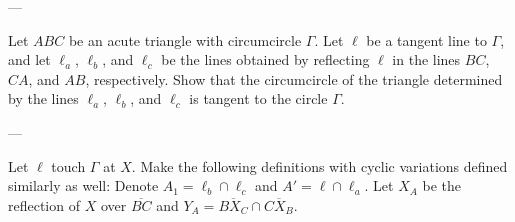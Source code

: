 
---

Let $ABC$ be an acute triangle with circumcircle $\Gamma$. Let $\ell$ be a tangent line to $\Gamma$, and let $\ell_a$, $\ell_b$, and $\ell_c$ be the lines obtained by reflecting $\ell$ in the lines $BC$, $CA$, and $AB$, respectively. Show that the circumcircle of the triangle determined by the lines $\ell_a$, $\ell_b$, and $\ell_c$ is tangent to the circle $\Gamma$.

---

Let $\ell$ touch $\Gamma$ at $X$. Make the following definitions with cyclic variations defined similarly as well: Denote $A_1=\ell_b\cap\ell_c$ and $A'=\ell\cap\ell_a$. Let $X_A$ be the reflection of $X$ over $\overline{BC}$ and $Y_A=\overline{BX_C}\cap\overline{CX_B}$.
